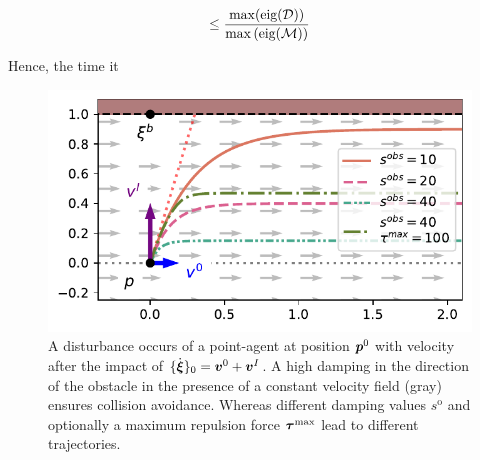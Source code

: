 \begin{equation}
	\leq \frac{\max({\text{eig}(\mathcal{D})})}{\max{(\text{eig}(\mathcal{M})}) }
\end{equation}

Hence, the time it  


\begin{figure}[htb]
\centering
  \centerline{\includegraphics[width=0.99\columnwidth]{figures/parallel_avoidance_obstacle}}
  \caption{A disturbance occurs of a point-agent at position $\boldsymbol{p}^0$ with velocity after the impact of $\{ \dot{\boldsymbol{\xi}} \}_0 = \boldsymbol{v}^0 + \boldsymbol{v}^I$. A high damping in the direction of the obstacle in the presence of a constant velocity field (gray) ensures collision avoidance. Whereas different damping values $s^{\mathrm{o}}$ and optionally a maximum repulsion force $\boldsymbol{\tau}^{\mathrm{max}}$ lead to different trajectories.}
  \label{fig:disturbance_with_parallel_velocity}
\end{figure}
    

